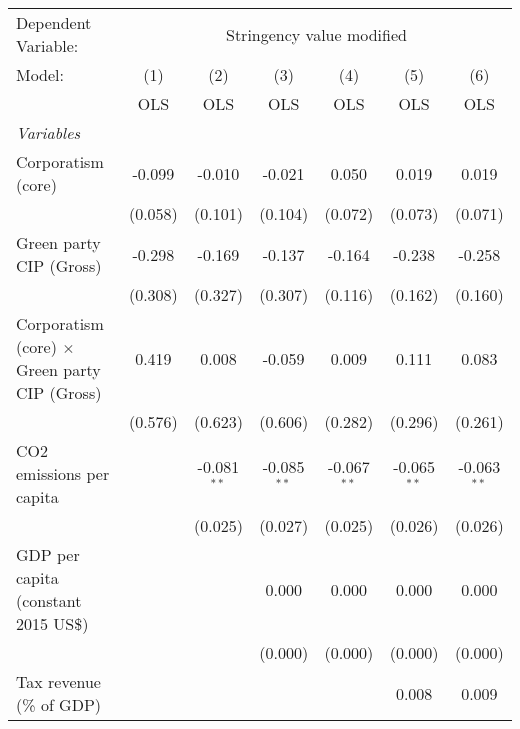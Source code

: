 
\begingroup
\centering
\begin{tabular}{lcccccc}
   \toprule
   Dependent Variable: & \multicolumn{6}{c}{Stringency value modified}\\
   Model:                                               & (1)     & (2)           & (3)           & (4)           & (5)           & (6)\\  
                                                        &  OLS    & OLS           & OLS           & OLS           & OLS           & OLS\\  
   \midrule
   \emph{Variables}\\
   Corporatism (core)                                   & -0.099  & -0.010        & -0.021        & 0.050         & 0.019         & 0.019\\   
                                                        & (0.058) & (0.101)       & (0.104)       & (0.072)       & (0.073)       & (0.071)\\   
   Green party CIP (Gross)                              & -0.298  & -0.169        & -0.137        & -0.164        & -0.238        & -0.258\\   
                                                        & (0.308) & (0.327)       & (0.307)       & (0.116)       & (0.162)       & (0.160)\\   
   Corporatism (core) $\times$ Green party CIP (Gross)  & 0.419   & 0.008         & -0.059        & 0.009         & 0.111         & 0.083\\   
                                                        & (0.576) & (0.623)       & (0.606)       & (0.282)       & (0.296)       & (0.261)\\   
   CO2 emissions per capita                             &         & -0.081$^{**}$ & -0.085$^{**}$ & -0.067$^{**}$ & -0.065$^{**}$ & -0.063$^{**}$\\   
                                                        &         & (0.025)       & (0.027)       & (0.025)       & (0.026)       & (0.026)\\   
   GDP per capita (constant 2015 US\$)                  &         &               & 0.000         & 0.000         & 0.000         & 0.000\\   
                                                        &         &               & (0.000)       & (0.000)       & (0.000)       & (0.000)\\   
   Tax revenue (\% of GDP)                              &         &               &               &               & 0.008         & 0.009\\   

\end{tabular}
